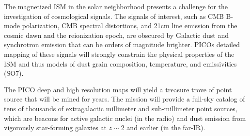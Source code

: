 \documentclass[PICOReport.tex]{subfiles}
\begin{document}
The magnetized ISM in the solar neighborhood presents a challenge for the investigation of cosmological signals. The signals of interest, such as CMB B-mode polarization, CMB spectral distortions, and 21cm line emission from the cosmic dawn and the reionization epoch, are obscured by Galactic dust and synchrotron emission that can be orders of magnitude brighter. PICOs detailed mapping of these signals will strongly constrain the physical properties of the ISM and thus models of dust grain composition, temperature, and emissivities (SO7). 

The PICO deep and high resolution maps will yield a treasure trove of point source that will be mined for years. The mission will provide a full-sky catalog of tens of thousands of extragalactic millimeter and sub-millimeter point sources, which are beacons for active galactic nuclei (in the radio) and dust emission from vigorously star-forming galaxies at $z \sim 2$ and earlier (in the far-IR). 


\end{document}
